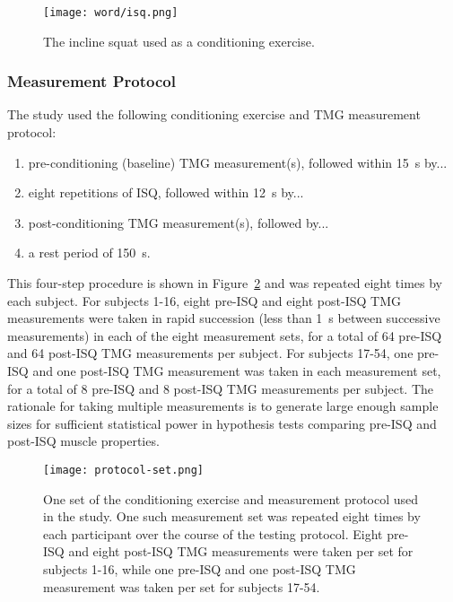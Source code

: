 \documentclass[utf8]{style/FrontiersinHarvard}
\begin{document}
\begin{figure}[htb!]
	\centering
    \texttt{[image: word/isq.png]}
    \caption{The incline squat used as a conditioning exercise.}
    \label{fig:isq}
\end{figure}

\subsubsection{Measurement Protocol} \label{sss:measurement_protocol}
The study used the following conditioning exercise and TMG measurement protocol:
\begin{enumerate}

    \item pre-conditioning (baseline) TMG measurement(s), followed within \SI{15}{\second} by...

    \item eight repetitions of ISQ, followed within \SI{12}{\second} by...

    \item post-conditioning TMG measurement(s), followed by...

    \item a rest period of \SI{150}{\second}.

\end{enumerate}
This four-step procedure is shown in Figure~\ref{fig:protocol} and was repeated eight times by each subject.
For subjects 1-16, eight pre-ISQ and eight post-ISQ TMG measurements were taken in rapid succession (less than \SI{1}{\second} between successive measurements) in each of the eight measurement sets, for a total of 64 pre-ISQ and 64 post-ISQ TMG measurements per subject.
For subjects 17-54, one pre-ISQ and one post-ISQ TMG measurement was taken in each measurement set, for a total of 8 pre-ISQ and 8 post-ISQ TMG measurements per subject.
The rationale for taking multiple measurements is to generate large enough sample sizes for sufficient statistical power in hypothesis tests comparing pre-ISQ and post-ISQ muscle properties.

\begin{figure}
	\centering
    \texttt{[image: protocol-set.png]}
    \caption{One set of the conditioning exercise and measurement protocol used in the study.
    One such measurement set was repeated eight times by each participant over the course of the testing protocol.
    Eight pre-ISQ and eight post-ISQ TMG measurements were taken per set for subjects 1-16, while one pre-ISQ and one post-ISQ TMG measurement was taken per set for subjects 17-54.}
    \label{fig:protocol}
\end{figure}
\end{document}
